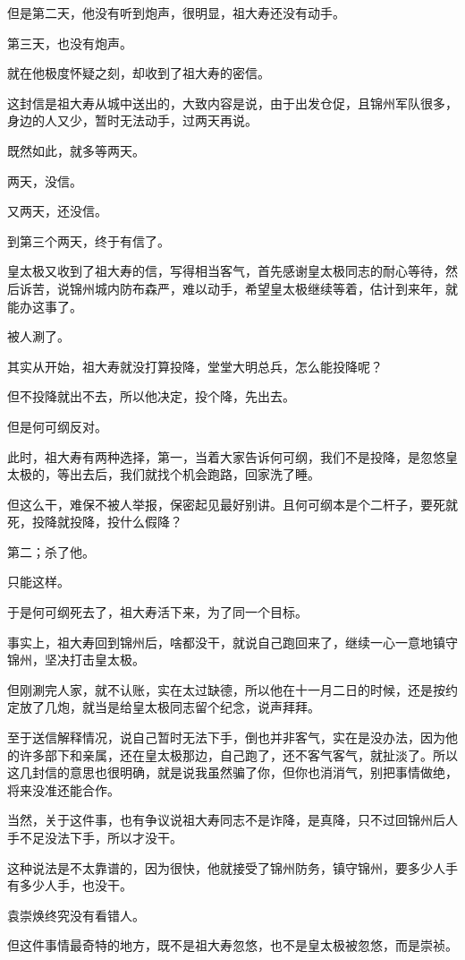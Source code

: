 \begin{multicols}{\theparacolNo}
但是第二天，他没有听到炮声，很明显，祖大寿还没有动手。

第三天，也没有炮声。

就在他极度怀疑之刻，却收到了祖大寿的密信。

这封信是祖大寿从城中送出的，大致内容是说，由于出发仓促，且锦州军队很多，身边的人又少，暂时无法动手，过两天再说。

既然如此，就多等两天。

两天，没信。

又两天，还没信。

到第三个两天，终于有信了。

皇太极又收到了祖大寿的信，写得相当客气，首先感谢皇太极同志的耐心等待，然后诉苦，说锦州城内防布森严，难以动手，希望皇太极继续等着，估计到来年，就能办这事了。

被人涮了。

其实从开始，祖大寿就没打算投降，堂堂大明总兵，怎么能投降呢？

但不投降就出不去，所以他决定，投个降，先出去。

但是何可纲反对。

此时，祖大寿有两种选择，第一，当着大家告诉何可纲，我们不是投降，是忽悠皇太极的，等出去后，我们就找个机会跑路，回家洗了睡。

但这么干，难保不被人举报，保密起见最好别讲。且何可纲本是个二杆子，要死就死，投降就投降，投什么假降？

第二；杀了他。

只能这样。

于是何可纲死去了，祖大寿活下来，为了同一个目标。

事实上，祖大寿回到锦州后，啥都没干，就说自己跑回来了，继续一心一意地镇守锦州，坚决打击皇太极。

但刚涮完人家，就不认账，实在太过缺德，所以他在十一月二日的时候，还是按约定放了几炮，就当是给皇太极同志留个纪念，说声拜拜。

至于送信解释情况，说自己暂时无法下手，倒也并非客气，实在是没办法，因为他的许多部下和亲属，还在皇太极那边，自己跑了，还不客气客气，就扯淡了。所以这几封信的意思也很明确，就是说我虽然骗了你，但你也消消气，别把事情做绝，将来没准还能合作。

当然，关于这件事，也有争议说祖大寿同志不是诈降，是真降，只不过回锦州后人手不足没法下手，所以才没干。

这种说法是不太靠谱的，因为很快，他就接受了锦州防务，镇守锦州，要多少人手有多少人手，也没干。

袁崇焕终究没有看错人。

但这件事情最奇特的地方，既不是祖大寿忽悠，也不是皇太极被忽悠，而是崇祯。


\end{multicols}
